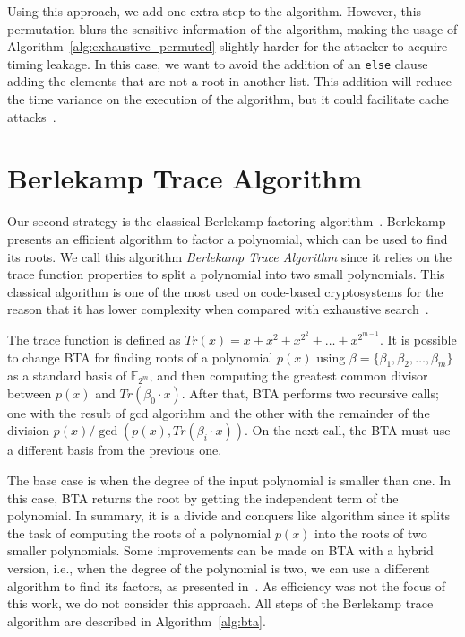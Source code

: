 Using this approach, we add one extra step to the algorithm. However, this permutation blurs the sensitive information of the algorithm, making the usage of Algorithm~\ref{alg:exhaustive_permuted} slightly harder for the attacker to acquire timing leakage. In this case, we want to avoid the addition of an \texttt{else} clause adding the elements that are not a root in another list. This addition will  reduce the time variance on the execution of the algorithm, but it could facilitate cache attacks~\cite{dan2005}.

\section{Berlekamp Trace Algorithm}
Our second strategy is the classical Berlekamp factoring algorithm~\cite{berlekamp1970factoring}. Berlekamp presents an efficient algorithm to factor a polynomial, which can be used to find its roots. We call this algorithm \emph{Berlekamp Trace Algorithm} since it relies on the trace function properties to split a polynomial into two small polynomials. This classical algorithm is one of the most used on code-based cryptosystems for the reason that it has lower complexity when compared with exhaustive search~\cite{biswas2009efficient}. 

The trace function is defined as $Tr(x) = x + x^{2} + x^{2^{2}} + \dots + x^{2^{m-1}}$. It is possible to change BTA for finding roots of a polynomial $p(x)$ using $\beta = \{\beta_1, \beta_2, \ldots, \beta_m\}$ as a standard basis of $\mathbb{F}_{2^{m}}$, and then computing the greatest common divisor between $p(x)$ and $Tr(\beta_0 \cdot x)$. After that, BTA performs two recursive calls; one with the result of gcd algorithm and the other with the remainder of the division $p(x) / \gcd(p(x), Tr(\beta_i \cdot x))$. On the next call, the BTA must use a different basis from the previous one. 

The base case is when the degree of the input polynomial is smaller than one. In this case, BTA returns the root by getting the independent term of the polynomial. In summary, it is a divide and conquers like algorithm since it splits the task of computing the roots of a polynomial $p(x)$ into the roots of two smaller polynomials. Some improvements can be made on BTA with a hybrid version, i.e., when the degree of the polynomial is two, we can use a different algorithm to find its factors, as presented in~\cite{strenzke2012fast}. As efficiency was not the focus of this work, we do not consider this approach. All steps of the Berlekamp trace algorithm are described in Algorithm~\ref{alg:bta}.


